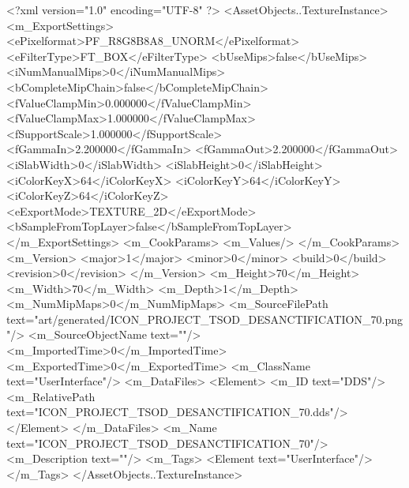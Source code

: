<?xml version="1.0" encoding="UTF-8" ?>
<AssetObjects..TextureInstance>
	<m_ExportSettings>
		<ePixelformat>PF_R8G8B8A8_UNORM</ePixelformat>
		<eFilterType>FT_BOX</eFilterType>
		<bUseMips>false</bUseMips>
		<iNumManualMips>0</iNumManualMips>
		<bCompleteMipChain>false</bCompleteMipChain>
		<fValueClampMin>0.000000</fValueClampMin>
		<fValueClampMax>1.000000</fValueClampMax>
		<fSupportScale>1.000000</fSupportScale>
		<fGammaIn>2.200000</fGammaIn>
		<fGammaOut>2.200000</fGammaOut>
		<iSlabWidth>0</iSlabWidth>
		<iSlabHeight>0</iSlabHeight>
		<iColorKeyX>64</iColorKeyX>
		<iColorKeyY>64</iColorKeyY>
		<iColorKeyZ>64</iColorKeyZ>
		<eExportMode>TEXTURE_2D</eExportMode>
		<bSampleFromTopLayer>false</bSampleFromTopLayer>
	</m_ExportSettings>
	<m_CookParams>
		<m_Values/>
	</m_CookParams>
	<m_Version>
		<major>1</major>
		<minor>0</minor>
		<build>0</build>
		<revision>0</revision>
	</m_Version>
	<m_Height>70</m_Height>
	<m_Width>70</m_Width>
	<m_Depth>1</m_Depth>
	<m_NumMipMaps>0</m_NumMipMaps>
	<m_SourceFilePath text="art/generated/ICON_PROJECT_TSOD_DESANCTIFICATION_70.png"/>
	<m_SourceObjectName text=""/>
	<m_ImportedTime>0</m_ImportedTime>
	<m_ExportedTime>0</m_ExportedTime>
	<m_ClassName text="UserInterface"/>
	<m_DataFiles>
		<Element>
			<m_ID text="DDS"/>
			<m_RelativePath text="ICON_PROJECT_TSOD_DESANCTIFICATION_70.dds"/>
		</Element>
	</m_DataFiles>
	<m_Name text="ICON_PROJECT_TSOD_DESANCTIFICATION_70"/>
	<m_Description text=""/>
	<m_Tags>
		<Element text="UserInterface"/>
	</m_Tags>
</AssetObjects..TextureInstance>

